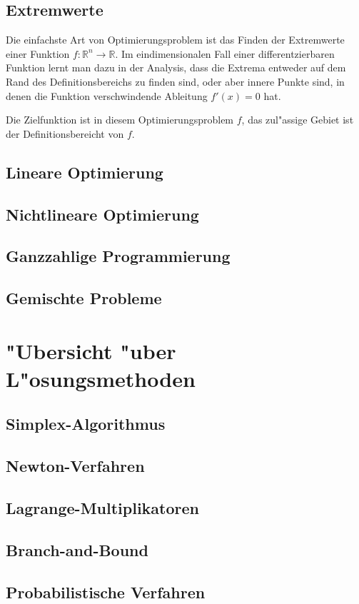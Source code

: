 \subsection{Extremwerte}
Die einfachste Art von Optimierungsproblem ist das Finden der Extremwerte
einer Funktion $f\colon\mathbb R^n\to\mathbb R$.
Im eindimensionalen Fall einer differentzierbaren Funktion lernt man dazu
in der Analysis, dass die Extrema entweder auf dem Rand des Definitionsbereichs
zu finden sind, oder aber innere Punkte sind, in denen die Funktion
verschwindende Ableitung $f'(x)=0$ hat.

Die Zielfunktion ist in diesem Optimierungsproblem $f$, das zul"assige
Gebiet ist der Definitionsbereicht von $f$.

\subsection{Lineare Optimierung}
\subsection{Nichtlineare Optimierung}
\subsection{Ganzzahlige Programmierung}
\subsection{Gemischte Probleme}

\section{"Ubersicht "uber L"osungsmethoden}
\subsection{Simplex-Algorithmus}
\subsection{Newton-Verfahren}
\subsection{Lagrange-Multiplikatoren}
\subsection{Branch-and-Bound}
\subsection{Probabilistische Verfahren}

